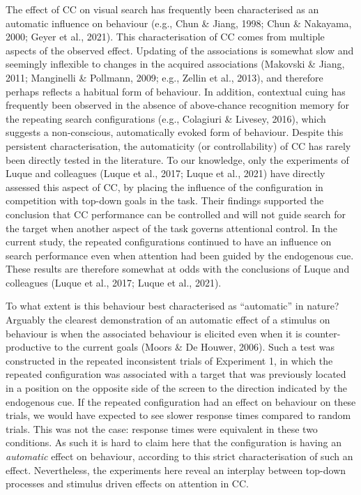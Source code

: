 \documentclass[
  man,floatsintext]{apa7}
\begin{document}
The effect of CC on visual search has frequently been characterised as an automatic influence on behaviour (e.g., Chun \& Jiang, 1998; Chun \& Nakayama, 2000; Geyer et al., 2021). This characterisation of CC comes from multiple aspects of the observed effect. Updating of the associations is somewhat slow and seemingly inflexible to changes in the acquired associations (Makovski \& Jiang, 2011; Manginelli \& Pollmann, 2009; e.g., Zellin et al., 2013), and therefore perhaps reflects a habitual form of behaviour. In addition, contextual cuing has frequently been observed in the absence of above-chance recognition memory for the repeating search configurations (e.g., Colagiuri \& Livesey, 2016), which suggests a non-conscious, automatically evoked form of behaviour. Despite this persistent characterisation, the automaticity (or controllability) of CC has rarely been directly tested in the literature. To our knowledge, only the experiments of Luque and colleagues (Luque et al., 2017; Luque et al., 2021) have directly assessed this aspect of CC, by placing the influence of the configuration in competition with top-down goals in the task. Their findings supported the conclusion that CC performance can be controlled and will not guide search for the target when another aspect of the task governs attentional control. In the current study, the repeated configurations continued to have an influence on search performance even when attention had been guided by the endogenous cue. These results are therefore somewhat at odds with the conclusions of Luque and colleagues (Luque et al., 2017; Luque et al., 2021).

To what extent is this behaviour best characterised as ``automatic'' in nature? Arguably the clearest demonstration of an automatic effect of a stimulus on behaviour is when the associated behaviour is elicited even when it is counter-productive to the current goals (Moors \& De Houwer, 2006). Such a test was constructed in the repeated inconsistent trials of Experiment 1, in which the repeated configuration was associated with a target that was previously located in a position on the opposite side of the screen to the direction indicated by the endogenous cue. If the repeated configuration had an effect on behaviour on these trials, we would have expected to see slower response times compared to random trials. This was not the case: response times were equivalent in these two conditions. As such it is hard to claim here that the configuration is having an \emph{automatic} effect on behaviour, according to this strict characterisation of such an effect. Nevertheless, the experiments here reveal an interplay between top-down processes and stimulus driven effects on attention in CC.
\end{document}
